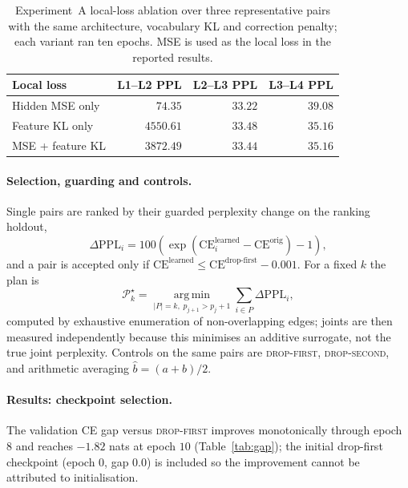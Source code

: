 \documentclass[10pt,a4paper]{article}
\newcommand{\dropfirst}{\textsc{drop-first}}
\newcommand{\dropsecond}{\textsc{drop-second}}
\newcommand{\ce}{\mathrm{CE}}
\begin{document}
\begin{table}[t]
\centering
\small
\begin{tabular}{l r r r}
\toprule
Local loss & L1--L2 PPL & L2--L3 PPL & L3--L4 PPL \\
\midrule
Hidden MSE only  & $74.35$ & $33.22$ & $39.08$ \\
Feature KL only  & $4550.61$ & $33.48$ & $35.16$ \\
MSE + feature KL & $3872.49$ & $33.44$ & $35.16$ \\
\bottomrule
\end{tabular}
\caption{Experiment~A local-loss ablation over three representative pairs with
the same architecture, vocabulary KL and correction penalty; each variant ran
ten epochs. MSE is used as the local loss in the reported results.}
\label{tab:lossab}
\end{table}

\paragraph{Selection, guarding and controls.} Single pairs are ranked by their
guarded perplexity change on the ranking holdout,
\begin{equation}
\label{eq:dppl}
\Delta\text{PPL}_i = 100\left(\exp\!\left(\ce_i^\text{learned} -
\ce^\text{orig}\right) - 1\right),
\end{equation}
and a pair is accepted only if
$\ce^\text{learned} \le \ce^\text{drop-first} - 0.001$. For a fixed $k$ the plan
is
\begin{equation}
\mathcal{P}^\star_k = \operatorname*{arg\,min}_{|P|=k,\; p_{j+1}>p_j+1}
\sum_{i\in P}\Delta\text{PPL}_i,
\end{equation}
computed by exhaustive enumeration of
non-overlapping edges; joints are then measured independently because this
minimises an additive surrogate, not the true joint perplexity. Controls on the
same pairs are \dropfirst{}, \dropsecond{}, and arithmetic averaging
$\hat b=(a+b)/2$.

\paragraph{Results: checkpoint selection.} The validation CE gap versus
\dropfirst{} improves monotonically through epoch $8$ and reaches $-1.82$ nats at
epoch $10$ (Table~\ref{tab:gap}); the initial drop-first checkpoint (epoch $0$,
gap $0.0$) is included so the improvement cannot be attributed to
initialisation.
\end{document}
